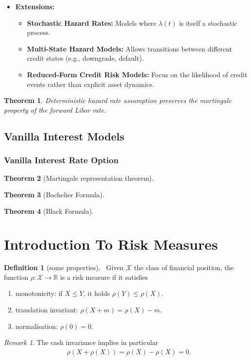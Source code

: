 \documentclass[a4paper,11pt]{book}
\newtheorem{theorem}{Theorem}[section]
\theoremstyle{definition}
\newtheorem{definition}{Definition}[section]
\theoremstyle{remark}
\newtheorem*{remark}{Remark}
\begin{document}
\begin{itemize}
    \item \textbf{Extensions:}
    \begin{itemize}
        \item \textbf{Stochastic Hazard Rates:} Models where \(\lambda(t)\) is itself a stochastic process.
        \item \textbf{Multi-State Hazard Models:} Allows transitions between different credit states (e.g., downgrade, default).
        \item \textbf{Reduced-Form Credit Risk Models:} Focus on the likelihood of credit events rather than explicit asset dynamics.
    \end{itemize}
\end{itemize}


\begin{theorem}
	Deterministic hazard rate assumption preserves the martingale property of the forward Libor rate.
\end{theorem}


\subsection{Vanilla Interest Models}
\subsubsection{Vanilla Interest Rate Option}

\begin{theorem}[Martingale representation theorem]
\end{theorem}

\begin{theorem}[Bachelier Formula]	
\end{theorem}

\begin{theorem}[Black Formula]
\end{theorem}



\section{Introduction To Risk Measures}
\begin{definition}[some properties]\
Given $\mathcal{X}$ the class of financial position, the function $\rho: \mathcal{X} \rightarrow \mathbb{R}$ is a risk measure if it satisfies
\begin{enumerate}
	\item monotonicity: if $X \le Y$, it holds $\rho(Y) \le \rho(X)$. 
	\item translation invariant: $\rho(X + m) = \rho(X) - m$. 
	\item normalisation: $\rho(0) = 0$. 
\end{enumerate}
\end{definition}
\begin{remark}
The cash invariance implies in particular
\begin{align*}
	& \rho(X + \rho(X)) = \rho(X) - \rho(X) = 0.
\end{align*}	
\end{remark}
\end{document}
